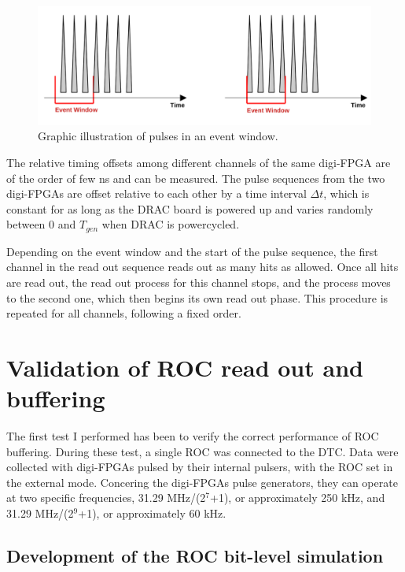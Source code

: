     \begin{figure}[!h]
    \centering
    \includegraphics[width =1\textwidth]{figures/png/finalimg.png}
    \caption[Graphic illustration of pulses in an event window.]{Graphic illustration of pulses in an event window.}
    \label{fig:timing}
    \end{figure}

    The relative timing offsets among different channels of 
    the same digi-FPGA are of the order of few ns and can be 
    measured. The pulse sequences from the two digi-FPGAs are offset 
    relative to each other by a time interval $\Delta t$, which is 
    constant for as long as the DRAC board is 
    powered up and varies randomly between 0 and $T_{gen}$ 
    when DRAC is powercycled.


    Depending on the event window and the start of the pulse 
    sequence, the first channel in the read out sequence 
    reads out as many hits as allowed. Once all hits are read out, 
    the read out process for this channel 
    stops, and the process moves to the second one, 
    which then begins its own read out phase. This procedure 
    is repeated for all channels, following a fixed order.
\section{Validation of ROC read out and buffering}
The first test I performed has been to verify the correct performance of 
ROC buffering.
During these test, a single ROC was connected to the DTC. 
Data were collected with digi-FPGAs pulsed by their internal pulsers, 
with the ROC set in the external mode. 
Concering the digi-FPGAs pulse generators, they can operate at two specific frequencies, 
31.29 MHz/(2$^7$+1), or approximately 250 kHz, 
and 31.29 MHz/(2$^9$+1), or approximately 60 kHz.
        
\subsection{Development of the ROC bit-level simulation}\label{MonteCarlo}
 
